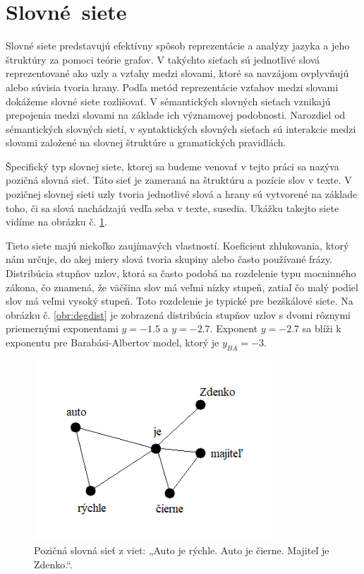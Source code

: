 \section{Slovné~siete}\label{sec:word-networks}

Slovné siete predstavujú efektívny spôsob reprezentácie a analýzy jazyka a jeho štruktúry za pomoci teórie grafov.
V takýchto sieťach sú jednotlivé slová reprezentované ako uzly a vzťahy medzi slovami, ktoré sa navzájom ovplyvňujú alebo súvisia
tvoria hrany\cite{motter2002topology}. Podľa metód reprezentácie vzťahov medzi slovami dokážeme slovné siete rozlišovať.
V sémantických slovných sieťach vznikajú prepojenia medzi slovami na základe ich významovej podobnosti. Narozdiel od sémantických
slovných sietí, v syntaktických slovných sieťach sú interakcie medzi slovami založené na slovnej štruktúre a gramatických pravidlách.

Špecifický typ slovnej siete, ktorej sa budeme venovať v tejto práci sa nazýva pozičná slovná sieť. Táto sieť je zameraná na štruktúru
a pozície slov v texte. V pozičnej slovnej sieti uzly tvoria jednotlivé slová a hrany sú vytvorené na základe toho, či sa slová nachádzajú
vedľa seba v texte, susedia. Ukážku takejto siete vidíme na obrázku č. \ref{obr:wan}.

Tieto siete majú niekoľko zaujímavých vlastností. Koeficient zhlukovania, ktorý nám určuje, do akej
miery slová tvoria skupiny alebo často používané frázy. Distribúcia stupňov uzlov, ktorá sa často podobá na rozdelenie 
typu mocninného zákona, čo znamená, že väčšina slov má veľmi nízky stupeň, zatiaľ čo malý podiel slov má veľmi vysoký stupeň\cite{dorogovtsev2001language}.
Toto rozdelenie je typické pre bezškálové siete. Na obrázku č. \ref{obr:degdist} je zobrazená distribúcia stupňov uzlov s dvomi
rôznymi priemernými exponentami $y = -1.5$ a $y = -2.7$. Exponent $y = -2.7$ sa blíži k exponentu pre Barabási-Albertov model, ktorý je
$y_{BA} = -3$\cite{cancho2001small}.

\begin{figure}
    \centerline{\includegraphics[width=0.8\textwidth]{images/wan.png}}
    \caption[Pozičná slovná sieť.]{Pozičná slovná sieť z viet: „Auto je rýchle. Auto je čierne. Majiteľ je Zdenko.“.}
    \label{obr:wan}
\end{figure}

